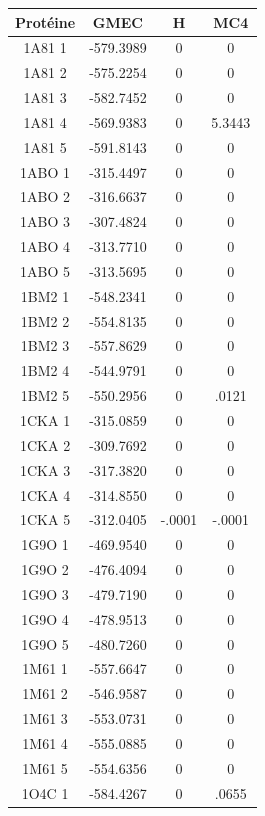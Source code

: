 \documentclass[a4paper,12pt]{article}
\begin{document}
    \begin{table}[h]
      \centering

      \begin{tabular}{|c|c|c|c|}



   \hline
   \hline
   Protéine & GMEC & H & MC4 \\
   \hline
   1A81 1 & -579.3989 & 0 & 0 \\
   1A81 2 & -575.2254 & 0 & 0 \\
   1A81 3 & -582.7452 & 0 & 0 \\
   1A81 4 & -569.9383 & 0 & 5.3443 \\
   1A81 5 & -591.8143 & 0 & 0 \\
   1ABO 1 & -315.4497 & 0 & 0 \\
   1ABO 2 & -316.6637 & 0 & 0 \\
   1ABO 3 & -307.4824 & 0 & 0 \\
   1ABO 4 & -313.7710 & 0 & 0 \\
   1ABO 5 & -313.5695 & 0 & 0 \\
   1BM2 1 & -548.2341 & 0 & 0 \\
   1BM2 2 & -554.8135 & 0 & 0 \\
   1BM2 3 & -557.8629 & 0 & 0 \\
   1BM2 4 & -544.9791 & 0 & 0 \\
   1BM2 5 & -550.2956 & 0 & .0121 \\
   1CKA 1 & -315.0859 & 0 & 0 \\
   1CKA 2 & -309.7692 & 0 & 0 \\
   1CKA 3 & -317.3820 & 0 & 0 \\
   1CKA 4 & -314.8550 & 0 & 0 \\
   1CKA 5 & -312.0405 & -.0001 & -.0001 \\
   1G9O 1 & -469.9540 & 0 & 0 \\
   1G9O 2 & -476.4094 & 0 & 0 \\
   1G9O 3 & -479.7190 & 0 & 0 \\
   1G9O 4 & -478.9513 & 0 & 0 \\
   1G9O 5 & -480.7260 & 0 & 0 \\
   1M61 1 & -557.6647 & 0 & 0 \\
   1M61 2 & -546.9587 & 0 & 0 \\
   1M61 3 & -553.0731 & 0 & 0 \\
   1M61 4 & -555.0885 & 0 & 0 \\
   1M61 5 & -554.6356 & 0 & 0 \\
   1O4C 1 & -584.4267 & 0 & .0655 \\

\end{tabular}
\end{table}
\end{document}
